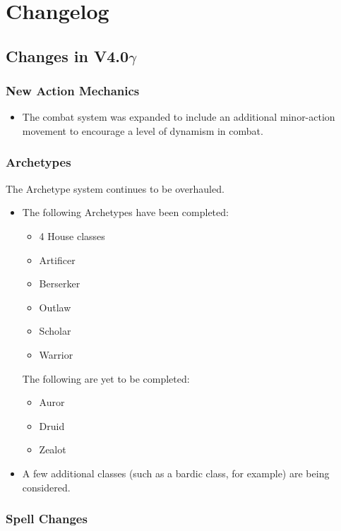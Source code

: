 \twocolumn
\chapter{Changelog}

\section{Changes in V4.0$\gamma$}

\subsection{New Action Mechanics}

\begin{itemize}
	\item The combat system was expanded to include an additional minor-action movement to encourage a level of dynamism in combat.
\end{itemize}

\subsection{Archetypes}

The Archetype system continues to be overhauled. 
\begin{itemize}
	\item The following Archetypes have been completed:
	\begin{itemize}
		\item 4 House classes
		\item Artificer
		\item Berserker
		\item Outlaw
		\item Scholar
		\item Warrior
	\end{itemize}
	The following are yet to be completed:
	\begin{itemize}
		\item Auror
		\item Druid
		\item Zealot
	\end{itemize}
	\item A few additional classes (such as a bardic class, for example) are being considered. 
\end{itemize}



\subsection{Spell Changes}

